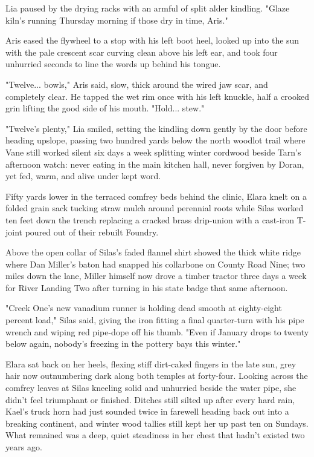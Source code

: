 Lia paused by the drying racks with an armful of split alder kindling. "Glaze kiln's running Thursday morning if those dry in time, Aris."

Aris eased the flywheel to a stop with his left boot heel, looked up into the sun with the pale crescent scar curving clean above his left ear, and took four unhurried seconds to line the words up behind his tongue.

"Twelve... bowls," Aris said, slow, thick around the wired jaw scar, and completely clear. He tapped the wet rim once with his left knuckle, half a crooked grin lifting the good side of his mouth. "Hold... stew."

"Twelve's plenty," Lia smiled, setting the kindling down gently by the door before heading upslope, passing two hundred yards below the north woodlot trail where Vane still worked silent six days a week splitting winter cordwood beside Tarn's afternoon watch: never eating in the main kitchen hall, never forgiven by Doran, yet fed, warm, and alive under kept word.

Fifty yards lower in the terraced comfrey beds behind the clinic, Elara knelt on a folded grain sack tucking straw mulch around perennial roots while Silas worked ten feet down the trench replacing a cracked brass drip-union with a cast-iron T-joint poured out of their rebuilt Foundry.

Above the open collar of Silas's faded flannel shirt showed the thick white ridge where Dan Miller's baton had snapped his collarbone on County Road Nine; two miles down the lane, Miller himself now drove a timber tractor three days a week for River Landing Two after turning in his state badge that same afternoon.

"Creek One's new vanadium runner is holding dead smooth at eighty-eight percent load," Silas said, giving the iron fitting a final quarter-turn with his pipe wrench and wiping red pipe-dope off his thumb. "Even if January drops to twenty below again, nobody's freezing in the pottery bays this winter."

Elara sat back on her heels, flexing stiff dirt-caked fingers in the late sun, grey hair now outnumbering dark along both temples at forty-four. Looking across the comfrey leaves at Silas kneeling solid and unhurried beside the water pipe, she didn't feel triumphant or finished. Ditches still silted up after every hard rain, Kael's truck horn had just sounded twice in farewell heading back out into a breaking continent, and winter wood tallies still kept her up past ten on Sundays. What remained was a deep, quiet steadiness in her chest that hadn't existed two years ago.


